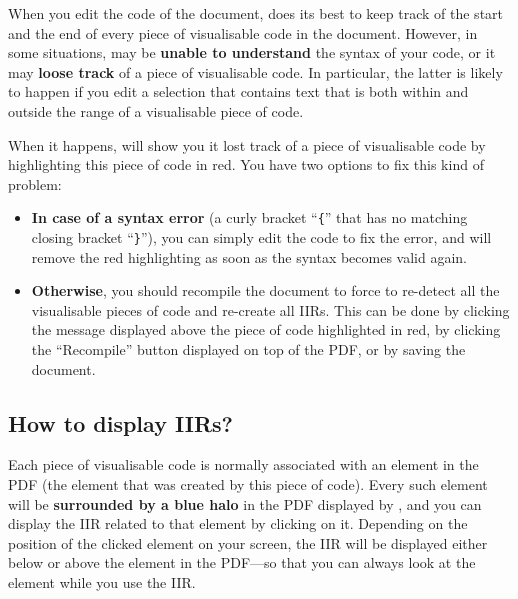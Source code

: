 \documentclass[11pt, a4paper]{article}
\begin{document}
\begin{warning}
    When you edit the code of the document, \iLaTeX{} does its best to keep track of the start and the end of every piece of visualisable code in the document.
    However, in some situations, \iLaTeX{} may be \textbf{unable to understand} the syntax of your code, or it may \textbf{loose track} of a piece of visualisable code.
    In particular, the latter is likely to happen if you edit a selection that contains text that is both within and outside the range of a visualisable piece of code.
    
    When it happens, \iLaTeX{} will show you it lost track of a piece of visualisable code by highlighting this piece of code in red.
    You have two options to fix this kind of problem:
    
    \begin{itemize}
        \item \textbf{In case of a syntax error} (\eg a curly bracket ``\verb|{|'' that has no matching closing bracket ``\verb|}|''), you can simply edit the code to fix the error, and \iLaTeX{} will remove the red highlighting as soon as the syntax becomes valid again.
        
        \item \textbf{Otherwise}, you should recompile the document to force \iLaTeX{} to re-detect all the visualisable pieces of code and re-create all IIRs.
        This can be done by clicking the message displayed above the piece of code highlighted in red, by clicking the ``Recompile'' button displayed on top of the PDF, or by saving the document.
    \end{itemize}
\end{warning}


\subsection{How to display IIRs?}

Each piece of visualisable code is normally associated with an element in the PDF (the element that was created by this piece of code).
Every such element will be \textbf{surrounded by a blue halo} in the PDF displayed by \iLaTeX{}, and you can display the IIR related to that element by clicking on it.
Depending on the position of the clicked element on your screen, the IIR will be displayed either below or above the element in the PDF---so that you can always look at the element while you use the IIR.
\end{document}
